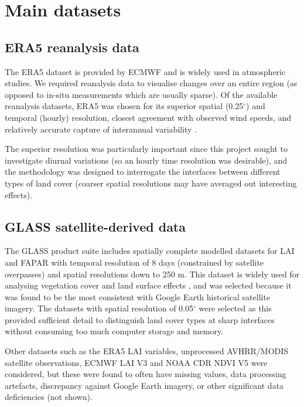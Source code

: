 \section{Main datasets}

\subsection{ERA5 reanalysis data}

The \ac{ERA5} dataset is provided by \ac{ECMWF} and is widely used in atmospheric studies. We required reanalysis data to visualise changes over an entire region (as opposed to in-situ measurements which are usually sparse). Of the available reanalysis datasets, ERA5 was chosen for its superior spatial (0.25$^\circ$) and temporal (hourly) resolution, closest agreement with observed wind speeds, and relatively accurate capture of interannual variability \citep{ramon2019, torralba2017}.

The superior resolution was particularly important since this project sought to investigate diurnal variations (so an hourly time resolution was desirable), and the methodology was designed to interrogate the interfaces between different types of land cover (coarser spatial resolutions may have averaged out interesting effects).

\subsection{GLASS satellite-derived data}

The \ac{GLASS} product suite includes spatially complete modelled datasets for \ac{LAI} and \ac{FAPAR} with temporal resolution of 8 days (constrained by satellite overpasses) and spatial resolutions down to 250 m. This dataset is widely used for analysing vegetation cover and land surface effects \citep{liang2021}, and was selected because it was found to be the most consistent with Google Earth historical satellite imagery. The datasets with spatial resolution of 0.05$^\circ$ were selected as this provided sufficient detail to distinguish land cover types at sharp interfaces without consuming too much computer storage and memory.

Other datasets such as the \ac{ERA5} \ac{LAI} variables, unprocessed {AVHRR}/{MODIS} satellite observations, \ac{ECMWF} \ac{LAI} V3 and \ac{NOAA} \ac{CDR} \ac{NDVI} V5 were considered, but these were found to often have missing values, data processing artefacts, discrepancy against Google Earth imagery, or other significant data deficiencies (not shown).


